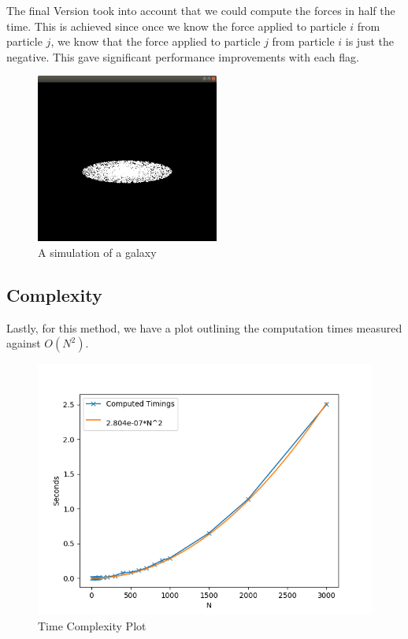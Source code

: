 The final Version took into account that we could compute the forces in half the time. This is achieved since once we know the force applied to particle $i$ from particle $j$, we know that the force applied to particle $j$ from particle $i$ is just the negative. This gave significant performance improvements with each flag.
\begin{figure}[htb]
  \begin{center}
    \includegraphics[width=6cm]{../images/space.jpg}
    \caption{A simulation of a galaxy}
  \end{center}
\end{figure}
\newpage
\subsection{Complexity}
Lastly, for this method, we have a plot outlining the computation times measured against $O(N^{2})$.
\begin{figure}[htb]
  \begin{center}
    \includegraphics[width=14cm]{../images/time_complexity.png}
    \caption{Time Complexity Plot}
  \end{center}
\end{figure}
